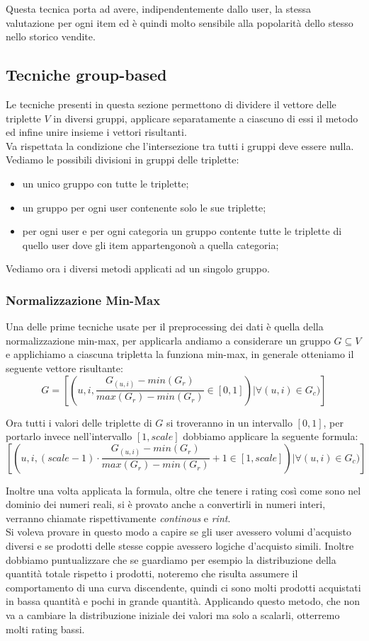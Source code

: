 Questa tecnica porta ad avere, indipendentemente dallo user, la stessa valutazione per ogni item ed è quindi molto sensibile alla popolarità dello stesso nello storico vendite.

\subsection{Tecniche group-based}
Le tecniche presenti in questa sezione permettono di dividere il vettore delle triplette $V$ in diversi gruppi, applicare separatamente a ciascuno di essi il metodo ed infine unire insieme i vettori risultanti. \\
Va rispettata la condizione che l'intersezione tra tutti i gruppi deve essere nulla.\\
Vediamo le possibili divisioni in gruppi delle triplette:
\begin{itemize}
    \item un unico gruppo con tutte le triplette;
    \item un gruppo per ogni user contenente solo le sue triplette;
    \item per ogni user e per ogni categoria un gruppo contente tutte le triplette di quello user dove gli item appartengonoù a quella categoria;
\end{itemize}

Vediamo ora i diversi metodi applicati ad un singolo gruppo.
\subsubsection{Normalizzazione Min-Max}
Una delle prime tecniche usate per il preprocessing dei dati è quella della normalizzazione min-max, per applicarla andiamo a considerare un gruppo $G \subseteq V$ e applichiamo a ciascuna tripletta la funziona min-max, in generale otteniamo il seguente vettore risultante:
$$G = [(u, i, \frac{G_{(u,i)} - min(G_r)}{max(G_r) - min(G_r)} \in [0,1]) |  \forall (u,i) \in G_{c})]$$

Ora tutti i valori delle triplette di $G$ si troveranno in un intervallo $[0,1]$, per portarlo invece nell'intervallo $[1,scale]$ dobbiamo applicare la seguente formula:
$$[(u, i, (scale -1) \cdot \frac{G_{(u,i)} - min(G_r)}{max(G_r) - min(G_r)} + 1 \in [1,scale]) |  \forall (u,i) \in G_{c})]$$

Inoltre una volta applicata la formula, oltre che tenere i rating così come sono nel dominio dei numeri reali, si è provato anche a convertirli in numeri interi, verranno chiamate rispettivamente \textit{continous} e \textit{rint}.\\
Si voleva provare in questo modo a capire se gli user avessero volumi d'acquisto diversi e se prodotti delle stesse coppie avessero logiche d'acquisto simili. 
Inoltre dobbiamo puntualizzare che se guardiamo per esempio la distribuzione della quantità totale rispetto i prodotti, noteremo che risulta assumere il comportamento di una curva discendente, quindi ci sono molti prodotti acquistati in bassa quantità e pochi in grande quantità. Applicando questo metodo, che non va a cambiare la distribuzione iniziale dei valori ma solo a scalarli, otterremo molti rating bassi.

